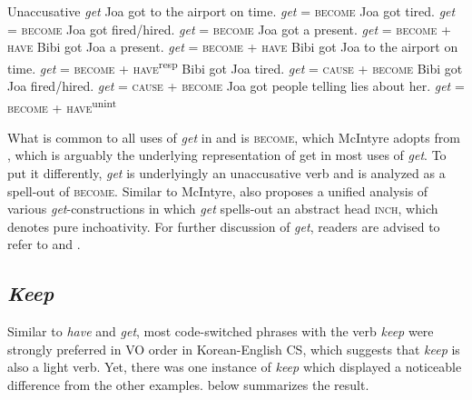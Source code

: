 \ea\label{ex:131} Unaccusative \textit{get}          
    \ea Joa got to the airport on time. \hfill      \textit{get} = \textsc{become}
    \ex Joa got tired.    \hfill \textit{get} = \textsc{become}
    \ex Joa got fired/hired. \hfill  \textit{get} = \textsc{become}
    \z
\clearpage
\ex\label{ex:132}
    \ea Joa got a present.  \hfill  \textit{get} = \textsc{become} \textsc{+} \textsc{have}
    \ex Bibi got Joa a present. \hfill   \textit{get} = \textsc{become} \textsc{+} \textsc{have}
    \ex Bibi got Joa to the airport on time. \hfill  \textit{get} = \textsc{become} \textsc{+} \textsc{have}\textsuperscript{resp}
    \ex Bibi got Joa tired. \hfill \textit{get} = \textsc{cause} \textsc{+} \textsc{become}
    \ex Bibi got Joa fired/hired. \hfill  \textit{get} = \textsc{cause} \textsc{+} \textsc{become}
    \ex Joa got people telling lies about her. \hfill    \textit{get} = \textsc{become} \textsc{+} \textsc{have}\textsuperscript{unint}  
    \z
\z

What is common to all uses of \textit{get} in  and  is \textsc{become}, which McIntyre adopts from , which is arguably the underlying representation of get in most uses of \textit{get}. To put it differently, \textit{get} is underlyingly an unaccusative verb and is analyzed as a spell-out of \textsc{become}. Similar to McIntyre, \citet{Shim2006} also proposes a unified analysis of various \textit{get}-constructions in which \textit{get} spells-out an abstract head \textsc{inch}, which denotes pure inchoativity. For further discussion of \textit{get}, readers are advised to refer to \citet{McIntyre2005a} and \citet{Shim2006}.


\subsection{\textit{Keep}}\label{ch5:sect:5.7.3}

Similar to \textit{have} and \textit{get}, most code-switched phrases with the verb \textit{keep} were strongly preferred in \ac{VO} order in Korean-English \ac{CS}, which suggests that \textit{keep} is also a light verb. Yet, there was one instance of \textit{keep} which displayed a noticeable difference from the other examples.  below summarizes the result. 

